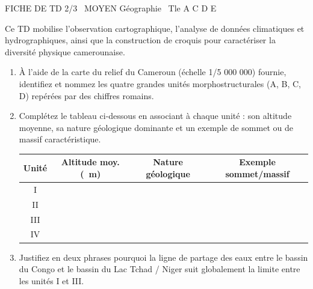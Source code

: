 \documentclass[11pt]{article}
\begin{document}
\begin{tcolorbox}[enhanced,colback=popink,colframe=popink,arc=10pt,boxrule=0pt,left=12pt,right=12pt,top=9pt,bottom=9pt]
{\color{white}\popxbold\small FICHE DE TD 2/3 \textbullet\ MOYEN \hfill Géographie \textbullet\ Tle A C D E\par}
\end{tcolorbox}
\vspace{4pt}
Ce TD mobilise l'observation cartographique, l'analyse de données climatiques et hydrographiques, ainsi que la construction de croquis pour caractériser la diversité physique camerounaise.

\begin{exercice}
\begin{enumerate}
    \item À l'aide de la carte du relief du Cameroun (échelle 1/5 000 000) fournie, identifiez et nommez les quatre grandes unités morphostructurales (A, B, C, D) repérées par des chiffres romains.
    \item Complétez le tableau ci-dessous en associant à chaque unité : son altitude moyenne, sa nature géologique dominante et un exemple de sommet ou de massif caractéristique.
    \begin{tabular}{|c|c|c|c|}
    \hline
    \textbf{Unité} & \textbf{Altitude moy. (\SI{}{m})} & \textbf{Nature géologique} & \textbf{Exemple sommet/massif} \\
    \hline
    I & & & \\
    II & & & \\
    III & & & \\
    IV & & & \\
    \hline
    \end{tabular}
    \item Justifiez en deux phrases pourquoi la ligne de partage des eaux entre le bassin du Congo et le bassin du Lac Tchad / Niger suit globalement la limite entre les unités I et III.
\end{enumerate}
\end{exercice}
\end{document}
